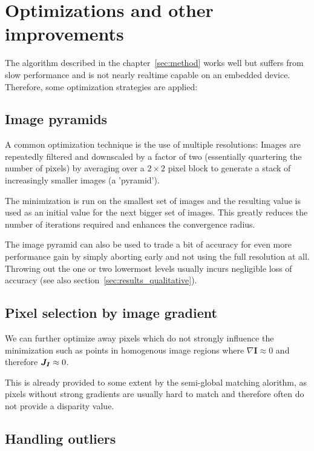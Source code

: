 \chapter{Optimizations and other improvements}
\label{sec:optimizations}

The algorithm described in the chapter~\ref{sec:method} works well but suffers from
slow performance and is not nearly realtime capable on an embedded device.
Therefore, some optimization strategies are applied:

\section{Image pyramids}
\label{sec:pyramids}

A common optimization technique is the use of multiple resolutions: Images are
repeatedly filtered and downscaled by a factor of two (essentially quartering
the number of pixels) by averaging over a $2 \times 2$ pixel block to generate
a stack of increasingly smaller images (a 'pyramid').

The minimization is run on the smallest set of images and the resulting value
is used as an initial value for the next bigger set of images.
This greatly reduces the number of iterations required and enhances the
convergence radius.

The image pyramid can also be used to trade a bit of accuracy for even more
performance gain by simply aborting early and not using the full resolution at
all. Throwing out the one or two lowermost levels usually incurs negligible
loss of accuracy (see also section~\ref{sec:results_qualitative}).


\section{Pixel selection by image gradient}
\label{sec:gradient_filtering}

We can further optimize away pixels which do not strongly influence the
minimization such as points in homogenous image regions where $\nabla
\mathbf{I} \approx 0$ and therefore $\mat{J_I} \approx 0$.

This is already provided to some extent by the semi-global matching alorithm,
as pixels without strong gradients are usually hard to match and therefore often
do not provide a disparity value.

\section{Handling outliers}

